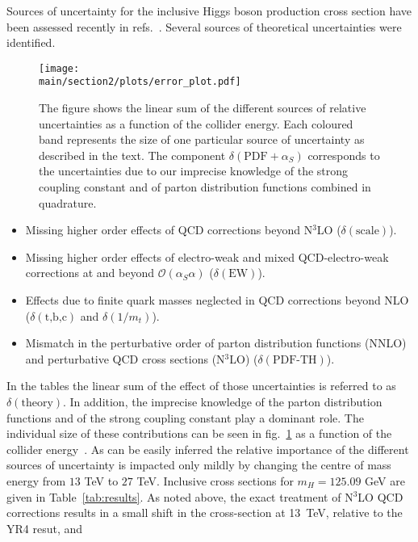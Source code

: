 Sources of uncertainty for the inclusive Higgs boson production cross section have been assessed recently in refs.~\cite{Anastasiou:2016cez,Harlander:2016hcx,Bonvini:2016frm,deFlorian:2016spz}. 
Several sources of theoretical uncertainties were identified.
\begin{figure}[h]
\begin{center}
    \texttt{[image: \\main/section2/plots/error\_plot.pdf]}
    \caption{
    The figure shows the linear sum of the different sources of relative uncertainties as a function of the collider energy. 
    Each coloured band represents the size of one particular source of uncertainty as described in the text.
    The component $\delta(\text{PDF}+\alpha_S)$ corresponds to the uncertainties due to our imprecise knowledge of the strong coupling constant and of parton distribution functions combined in quadrature.
        \label{fig:errorplot}}
        \end{center}
\end{figure}
\begin{itemize}
\item Missing higher order effects of QCD corrections beyond N$^3$LO ($\delta(\text{scale})$).
\item Missing higher order effects of electro-weak and mixed QCD-electro-weak corrections at and beyond $\mathcal{O}(\alpha_S \alpha)$ ($\delta(\text{EW})$).
\item Effects due to finite quark masses neglected in QCD corrections beyond NLO ($\delta(\text{t,b,c})$ and $\delta(1/m_t)$).
\item Mismatch in the perturbative order of parton distribution functions (NNLO) and perturbative QCD cross sections (N$^3$LO) ($\delta(\text{PDF-TH})$).
\end{itemize}
In the tables the linear sum of the effect of those uncertainties
is referred to as $\delta(\text{theory})$.  In addition, the imprecise
knowledge of the parton distribution functions and of the strong coupling
constant play a dominant role.  The individual size of these
contributions can be seen in fig.~\ref{fig:errorplot} as a function of
the collider energy~\cite{Dulat:2018rbf}.  As can be easily inferred
the relative importance of the different sources of uncertainty is
impacted only mildly by changing the centre of mass energy from $13$
TeV to $27$ TeV.  Inclusive cross sections for
$m_H=125.09$ GeV are given in Table~\ref{tab:results}. As noted above, the
exact treatment of N$^3$LO QCD corrections results in a
small shift in the cross-section at 13~TeV, relative to the YR4 resut, and
